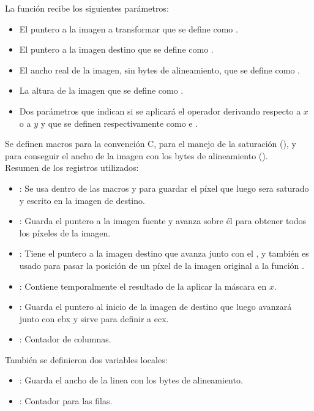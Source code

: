 La funci\'on recibe los siguientes par\'ametros:
\begin{itemize}
		\item El puntero a la imagen a transformar que se define como .
		\item El puntero a la imagen destino que se define como .
		\item El ancho real de la imagen, sin bytes de alineamiento, que se define como .
		\item La altura de la imagen que se define como .
		\item Dos par\'ametros que indican si se aplicar\'a el operador derivando respecto a $x$ o a $y$ y que se definen 
respectivamente como  e .
\end{itemize}

Se definen macros para la convenci\'on C, para el manejo de la saturaci\'on (), y para conseguir 
el ancho de la imagen con los bytes de alineamiento ().\\

\noindent Resumen de los registros utilizados:
\begin{itemize}
		\item {}: Se usa dentro de las macros y para guardar el p\'ixel que luego sera saturado y escrito 
en la imagen de destino.
		\item {}: Guarda el puntero a la imagen fuente y avanza sobre \'el para obtener todos los p\'ixeles 
de la imagen. 
		\item {}: Tiene el puntero a la imagen destino que avanza junto con el , y tambi\'en es usado 
para pasar la posici\'on de un p\'ixel de la imagen original a la funci\'on .
		\item {}: Contiene temporalmente el resultado de la aplicar la m\'ascara en $x$.
		\item {}: Guarda el puntero al inicio de la imagen de destino que luego avanzar\'a junto con ebx y sirve para definir a ecx.
		\item {}: Contador de columnas.
\end{itemize}

Tambi\'en se definieron dos variables locales:
\begin{itemize}
	\item {}: Guarda el ancho de la linea con los bytes de alineamiento.
	\item {}: Contador para las filas.
\end{itemize}

